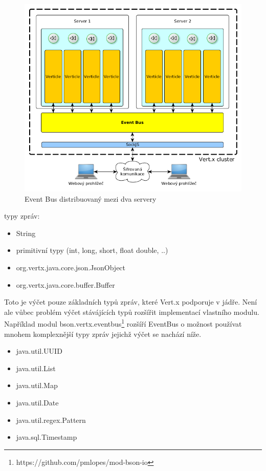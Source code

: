 \begin{figure}
\begin{centering}
\includegraphics[scale=0.5]{obrazky/2instance4_eventbus}
\par\end{centering}
\caption{Event Bus distribuovaný mezi dva servery}
\label{fig:2instance4_eventbus}
\end{figure}

typy zpráv:
\begin{itemize}
\item{String}
\item{primitivní typy (int, long, short, float double, ..)}
\item{org.vertx.java.core.json.JsonObject}
\item{org.vertx.java.core.buffer.Buffer}
\end{itemize}

Toto je výčet pouze základních typů zpráv, které Vert.x podporuje v jádře. Není ale vůbec problém výčet stávájících typů rozšířit implementací vlastního modulu. Například modul bson.vertx.eventbus\footnote{https://github.com/pmlopes/mod-bson-io} rozšíří EventBus o možnost používat mnohem komplexnější typy zpráv jejichž výčet se nachází níže.

\begin{itemize}
\item{java.util.UUID}	
\item{java.util.List}
\item{java.util.Map}
\item{java.util.Date}
\item{java.util.regex.Pattern}
\item{java.sql.Timestamp}
\end{itemize}

